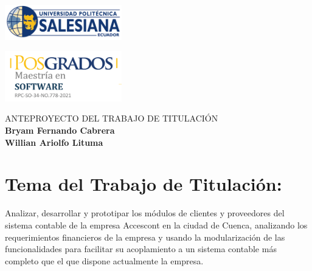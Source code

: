 \documentclass{article}
\begin{document}
\colorbox{white!10!}{
    \begin{minipage}[t]{0.05\textwidth} %
       \begin{flushright}
        \includegraphics[width=2in]{logo UPS.png}
       \end{flushright}
    \end{minipage}
    \begin{minipage}[H]{0.62 \textwidth} %
        \begin{center}
         
        \end{center}
     \end{minipage}
    \begin{minipage}[t]{0.05 \textwidth}
        \begin{flushleft}
        \hspace{10.25cm}
            \includegraphics[width=2in]{Posgrados.png}
        \end{flushleft}
    \end{minipage}
}

\vspace{0.1cm}
\begin{center}
{\large\textsc{ANTEPROYECTO DEL TRABAJO DE TITULACIÓN}} \\
\vspace{0.5cm}
{ \large \textbf{Bryam Fernando Cabrera}} \\ 
\vspace{0.25cm}
{ \large \textbf{Willian Ariolfo  Lituma}}
\end{center}
\vspace{0.1cm}

\section{Tema del Trabajo de Titulación:  }
\begin{center}
Analizar, desarrollar y prototipar los módulos de clientes y proveedores del sistema contable de la empresa Accescont en la ciudad de Cuenca, analizando los requerimientos financieros de la empresa y usando la modularización de las funcionalidades para facilitar su acoplamiento a un sistema contable más completo que el que dispone actualmente la empresa.    
\end{center}
\end{document}
